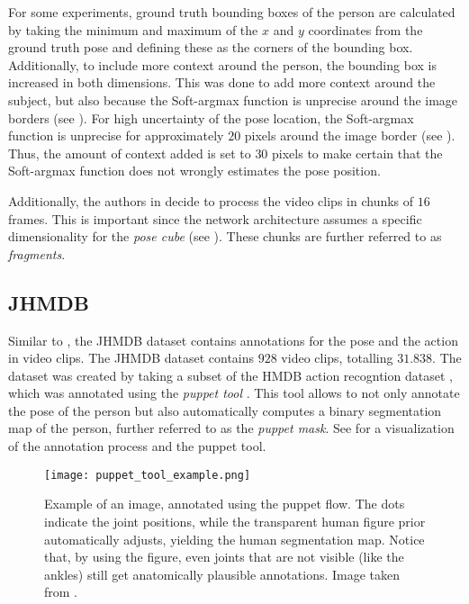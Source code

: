 For some experiments, ground truth bounding boxes of the person are calculated by taking the minimum and maximum of the $x$ and $y$ coordinates from the ground truth pose and defining these as the corners of the bounding box.
Additionally, to include more context around the person, the bounding box is increased in both dimensions.
This was done to add more context around the subject, but also because the Soft-argmax function is unprecise around the image borders (see ).
For high uncertainty of the pose location, the Soft-argmax function is unprecise for approximately $20$ pixels around the image border (see ).
Thus, the amount of context added is set to $30$ pixels to make certain that the Soft-argmax function does not wrongly estimates the pose position.

Additionally, the authors in \cite{luvizon_2d/3d_2018} decide to process the video clips in chunks of $16$ frames.
This is important since the network architecture assumes a specific dimensionality for the \textit{pose cube} (see ).
These chunks are further referred to as \textit{fragments}. 

\subsection{JHMDB}
\label{sec:exp-jhmdb}

Similar to \cite{zhang_actemes_2013} , the JHMDB dataset \cite{jhuang_towards_2013} contains annotations for the pose and the action in video clips.
The JHMDB dataset contains $928$ video clips, totalling $31.838$. 
The dataset was created by taking a subset of the HMDB action recogntion dataset \cite{kuehne_hmdb:_2011}, which was annotated using the \textit{puppet tool} \cite{zuffi_pictorial_2012}.
This tool allows to not only annotate the pose of the person but also automatically computes a binary segmentation map of the person, further referred to as the \textit{puppet mask}.
See  for a visualization of the annotation process and the puppet tool.

\begin{figure}[htb!]
    \centering
    \texttt{[image: puppet\_tool\_example.png]}
    \caption{Example of an image, annotated using the puppet flow. The dots indicate the joint positions, while the transparent human figure prior automatically adjusts, yielding the human segmentation map. Notice that, by using the figure, even joints that are not visible (like the ankles) still get anatomically plausible annotations. Image taken from \cite{max_planck_institute_for_intelligent_systems_jhmdb_nodate}.}
    \label{fig:puppet_tool_example}
\end{figure}

